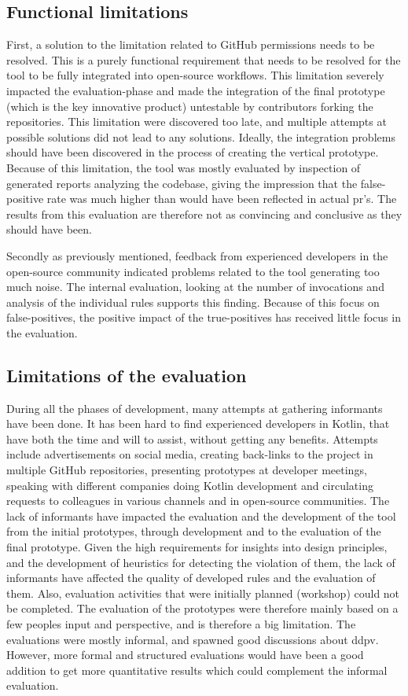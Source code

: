 \documentclass{report}
\begin{document}
\subsection*{Functional limitations}
First, a solution to the limitation related to GitHub permissions needs to be resolved. This is a purely functional requirement that needs to be resolved for the tool to be fully integrated into open-source workflows. This limitation severely impacted the evaluation-phase and made the integration of the final prototype (which is the key innovative product) untestable by contributors forking the repositories. This limitation were discovered too late, and multiple attempts at possible solutions did not lead to any solutions. Ideally, the integration problems should have been discovered in the process of creating the vertical prototype. Because of this limitation, the tool was mostly evaluated by inspection of generated reports analyzing the codebase, giving the impression that the false-positive rate was much higher than would have been reflected in actual \gls{pr}'s. The results from this evaluation are therefore not as convincing and conclusive as they should have been.

Secondly as previously mentioned, feedback from experienced developers in the open-source community indicated problems related to the tool generating too much noise. The internal evaluation, looking at the number of invocations and analysis of the individual rules supports this finding. Because of this focus on false-positives, the positive impact of the true-positives has received little focus in the evaluation.  

\subsection*{Limitations of the evaluation}
During all the phases of development, many attempts at gathering informants have been done. It has been hard to find experienced developers in Kotlin, that have both the time and will to assist, without getting any benefits. Attempts include advertisements on social media, creating back-links to the project in multiple GitHub repositories, presenting prototypes at developer meetings, speaking with different companies doing Kotlin development and circulating requests to colleagues in various channels and in open-source communities. The lack of informants have impacted the evaluation and the development of the tool from the initial prototypes, through development and to the evaluation of the final prototype. Given the high requirements for insights into design principles, and the development of heuristics for detecting the violation of them, the lack of informants have affected the quality of developed rules and the evaluation of them. Also, evaluation activities that were initially planned (workshop) could not be completed. The evaluation of the prototypes were therefore mainly based on a few peoples input and perspective, and is therefore a big limitation. The evaluations were mostly informal, and spawned good discussions about \gls{ddpv}. However, more formal and structured evaluations would have been a good addition to get more quantitative results which could complement the informal evaluation.
\end{document}
